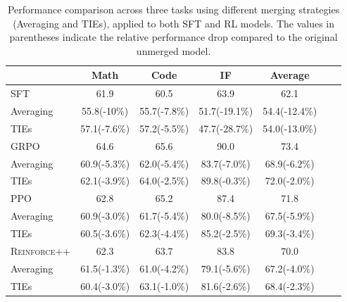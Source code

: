 \documentclass{article} %
\begin{document}
\begin{table}[]
\centering
\footnotesize
\renewcommand{\arraystretch}{1.3} 
\begin{tabular}{lcccccc}
\hline
                & \textbf{Math}         & \textbf{Code}         & \textbf{IF}             & \textbf{Average}  \\ \hline
SFT             & 61.9                  & 60.5                  & 63.9                    & 62.1 \\
Averaging       & 55.8(-10\%)           & 55.7(-7.8\%)          & 51.7(-19.1\%)           & 54.4(-12.4\%) \\
TIEs            & 57.1(-7.6\%)          & 57.2(-5.5\%)          & 47.7(-28.7\%)           & 54.0(-13.0\%) \\
\hline
GRPO            & 64.6                  & 65.6                  & 90.0                    & 73.4 \\
Averaging       & 60.9(-5.3\%)          & 62.0(-5.4\%)          & 83.7(-7.0\%)            & 68.9(-6.2\%) \\
TIEs            & 62.1(-3.9\%)          & 64.0(-2.5\%)          & 89.8(-0.3\%)            & 72.0(-2.0\%) \\ 
\hline
PPO             & 62.8                  & 65.2                  & 87.4                    & 71.8 \\
Averaging       & 60.9(-3.0\%)          & 61.7(-5.4\%)          & 80.0(-8.5\%)            & 67.5(-5.9\%) \\
TIEs            & 60.5(-3.6\%)          & 62.3(-4.4\%)          & 85.2(-2.5\%)            & 69.3(-3.4\%) \\ 
\hline
\textsc{Reinforce}++     & 62.3                  & 63.7                  & 83.8                    & 70.0 \\
Averaging       & 61.5(-1.3\%)          & 61.0(-4.2\%)          & 79.1(-5.6\%)            & 67.2(-4.0\%) \\
TIEs            & 60.4(-3.0\%)          & 63.1(-1.0\%)          & 81.6(-2.6\%)            & 68.4(-2.3\%) \\ 
\hline
\end{tabular}

\caption{Performance comparison across three tasks using different merging strategies (Averaging and TIEs), applied to both SFT and RL models. The values in parentheses indicate the relative performance drop compared to the original unmerged model.}
\label{table:algotithm_res}
\end{table}
\end{document}
